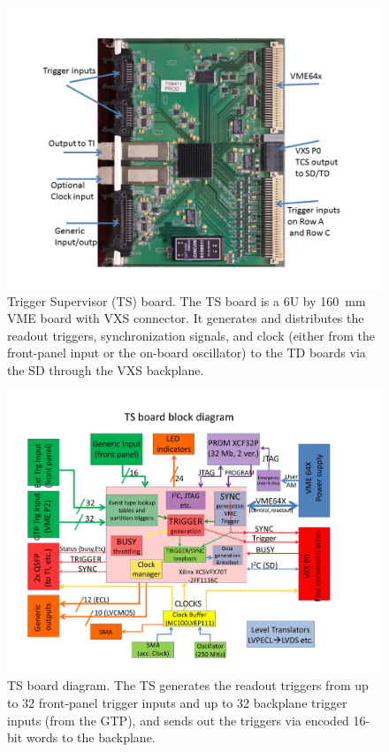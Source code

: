 \begin{figure}[hbt]
	\centering
	\includegraphics[width=1.0\columnwidth,keepaspectratio]{img/TSused.jpg}
	\caption{Trigger Supervisor (TS) board.  The TS board is a 6U by 160~mm VME board with VXS connector.  It generates and distributes the readout triggers, synchronization signals, and clock (either from the front-panel input or the on-board oscillator) to the TD boards via the SD through the VXS backplane.}
	\label{fig:TSused}
\end{figure}

\begin{figure}[hbt]
	\centering
	\includegraphics[width=1.0\columnwidth,keepaspectratio]{img/TSdiagram.jpg}
	\caption{TS board diagram.  The TS generates the readout triggers from up to 32 front-panel trigger inputs and up to 32 backplane trigger inputs (from the GTP), and sends out the triggers via encoded 16-bit words to the backplane.}
	\label{fig:TSdiagram}
\end{figure}

